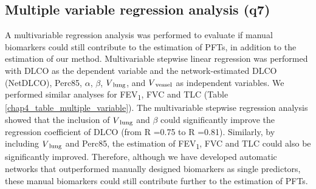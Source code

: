 \subsection{Multiple variable regression analysis (q7)}
A multivariable regression analysis was performed to evaluate if manual biomarkers could still contribute to the estimation of PFTs, in addition to the estimation of our method. Multivariable stepwise linear regression was performed with DLCO as the dependent variable and the network-estimated DLCO (NetDLCO), Perc85, $\alpha$, $\beta$, $V\textsubscript{lung}$, and $V\textsubscript{vessel}$ as independent variables. We performed similar analyses for FEV\textsubscript{1}, FVC and TLC (Table \ref{chap4_table_multiple_variable}). The multivariable stepwise regression analysis showed that the inclusion of $V\textsubscript{lung}$ and $\beta$ could significantly improve the regression coefficient of DLCO (from R =0.75 to R =0.81). Similarly, by including $V\textsubscript{lung}$ and Perc85, the estimation of FEV\textsubscript{1}, FVC and TLC could also be significantly improved. Therefore, although we have developed automatic networks that outperformed manually designed biomarkers as single predictors, these manual biomarkers could still contribute further to the estimation of PFTs.

